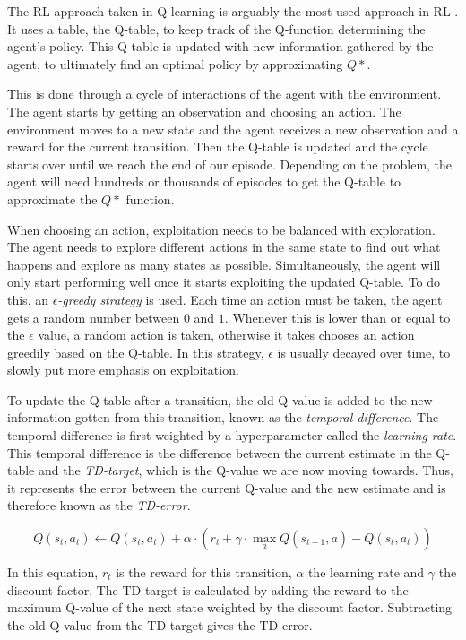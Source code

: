 The RL approach taken in Q-learning is arguably the most used approach in RL \cite{qlearning}. It uses a table, the Q-table, to keep track of the Q-function determining the agent's policy. This Q-table is updated with new information gathered by the agent, to ultimately find an optimal policy by approximating $Q*$.

This is done through a cycle of interactions of the agent with the environment. The agent starts by getting an observation and choosing an action. The environment moves to a new state and the agent receives a new observation and a reward for the current transition. Then the Q-table is updated and the cycle starts over until we reach the end of our episode. Depending on the problem, the agent will need hundreds or thousands of episodes to get the Q-table to approximate the $Q*$ function.

When choosing an action, exploitation needs to be balanced with exploration. The agent needs to explore different actions in the same state to find out what happens and explore as many states as possible. Simultaneously, the agent will only start performing well once it starts exploiting the updated Q-table. To do this, an \emph{$\epsilon$-greedy strategy} is used. Each time an action must be taken, the agent gets a random number between $0$ and $1$. Whenever this is lower than or equal to the $\epsilon$ value, a random action is taken, otherwise it takes chooses an action greedily based on the Q-table. In this strategy, $\epsilon$ is usually decayed over time, to slowly put more emphasis on exploitation.

To update the Q-table after a transition, the old Q-value is added to the new information gotten from this transition, known as the \emph{temporal difference}. The temporal difference is first weighted by a hyperparameter called the \emph{learning rate}. This temporal difference is the difference between the current estimate in the Q-table and the \emph{TD-target}, which is the Q-value we are now moving towards. Thus, it represents the error between the current Q-value and the new estimate and is therefore known as the \emph{TD-error}.

\begin{equation}
Q(s_t,a_t) \leftarrow Q(s_t,a_t) + \alpha \cdot (r_t + \gamma \cdot \max _{a} Q(s_{t+1},a) - Q(s_t,a_t))
\end{equation}

In this equation, $r_t$ is the reward for this transition, $\alpha$ the learning rate and $\gamma$ the discount factor. The TD-target is calculated by adding the reward to the maximum Q-value of the next state weighted by the discount factor. Subtracting the old Q-value from the TD-target gives the TD-error. 

